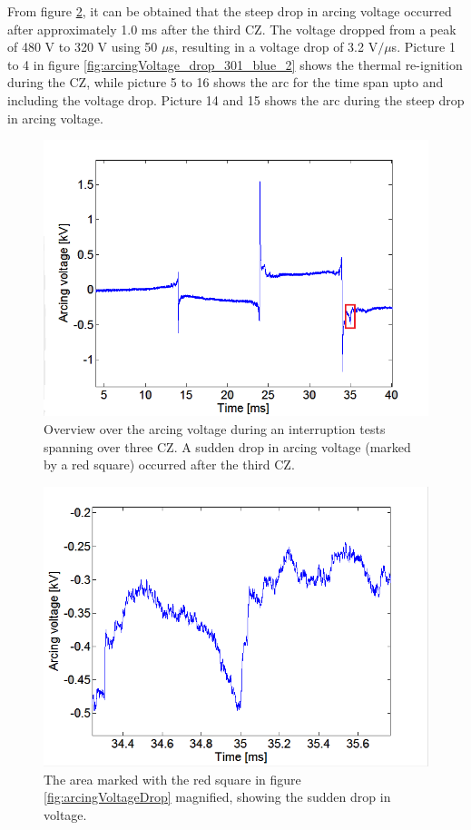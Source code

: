 \documentclass[10pt,b5paper,twoside]{article}
\begin{document}
From figure \ref{fig:arcingVoltageDrop_zoomed_2}, it can be obtained that the steep drop in arcing voltage occurred after approximately 1.0 ms after the third CZ. The voltage dropped from a peak of 480 V to 320 V using 50 $\mu$s, resulting in a voltage drop of 3.2 V$/  \mu$s. Picture 1 to 4 in figure \ref{fig:arcingVoltage_drop_301_blue_2} shows the thermal re-ignition during the CZ, while picture 5 to 16 shows the arc for the time span upto and including the voltage drop. Picture 14 and 15 shows the arc during the steep drop in arcing voltage.

\begin{figure}[H]
\centering
\includegraphics[scale=0.6, angle =0 ]{Bilder/Results/overviewArcingVoltageDrop_2.PNG}
\caption{Overview over the arcing voltage during an interruption tests spanning over three CZ. A sudden drop in arcing voltage (marked by a red square) occurred after the third CZ.} \label{fig:arcingVoltageDrop_2}
\end{figure}

\begin{figure}[H]
\centering
\includegraphics[scale=0.6, angle =0 ]{Bilder/Results/zoomArcingVoltageDrop_2.PNG}
\caption{The area marked with the red square in figure \ref{fig:arcingVoltageDrop} magnified, showing the sudden drop in voltage.} \label{fig:arcingVoltageDrop_zoomed_2}
\end{figure}
\end{document}
